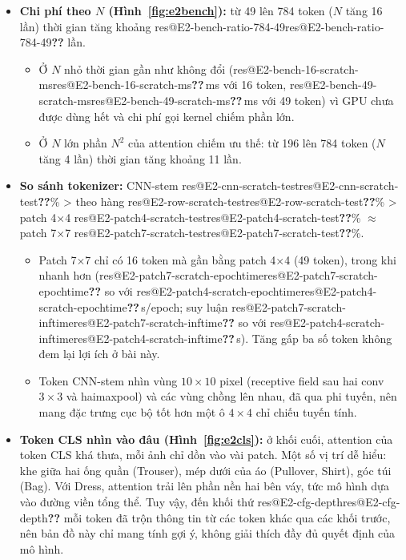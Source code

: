 \documentclass[twoside,final]{hcmut-report}
\makeatletter
\newcommand{\res}[1]{\ifcsname res@#1\endcsname\csname res@#1\endcsname\else\textbf{??}\fi}
\makeatother
\begin{document}
\begin{itemize}
\begin{itemize}
          \item Riêng ma trận $A$ đã chiếm \res{E2-bench-784-attnmb}\,MB và bản tự viết phải lưu nó cho backward. Kernel \texttt{scaled\_dot\_product\_attention} của PyTorch không tạo ra toàn bộ ma trận
                $N\times N$ mà tính lại khi backward.
        \end{itemize}
  \item \textbf{Chi phí theo $N$ (Hình~\ref{fig:e2bench}):} từ 49 lên 784 token ($N$ tăng 16 lần) thời gian tăng khoảng \res{E2-bench-ratio-784-49} lần.
        \begin{itemize}
          \item Ở $N$ nhỏ thời gian gần như không đổi (\res{E2-bench-16-scratch-ms}\,ms với 16 token, \res{E2-bench-49-scratch-ms}\,ms với 49 token) vì GPU chưa được dùng hết và chi phí gọi kernel chiếm phần lớn.
          \item Ở $N$ lớn phần $N^2$ của attention chiếm ưu thế: từ 196 lên 784 token ($N$  tăng 4 lần) thời gian tăng khoảng 11 lần.
        \end{itemize}
  \item \textbf{So sánh tokenizer:} CNN-stem \res{E2-cnn-scratch-test}\% > theo hàng \res{E2-row-scratch-test}\% > patch 4$\times$4 \res{E2-patch4-scratch-test}\% $\approx$ patch 7$\times$7 \res{E2-patch7-scratch-test}\%.
        \begin{itemize}
          \item Patch 7$\times$7 chỉ có 16 token mà gần bằng patch 4$\times$4 (49 token), trong khi nhanh hơn (\res{E2-patch7-scratch-epochtime} so với \res{E2-patch4-scratch-epochtime}\,s/epoch; suy luận \res{E2-patch7-scratch-inftime} so với \res{E2-patch4-scratch-inftime}\,s). Tăng gấp ba số token không đem lại lợi ích ở bài này.
          \item Token CNN-stem nhìn vùng $10\times10$ pixel (receptive field sau hai conv $3\times3$ và haimaxpool) và các vùng chồng lên nhau, đã qua phi tuyến, nên mang đặc trưng cục bộ tốt hơn một ô $4\times4$ chỉ chiếu tuyến tính.
        \end{itemize}
  \item \textbf{Token CLS nhìn vào đâu (Hình~\ref{fig:e2cls}):} ở khối cuối, attention của token CLS khá thưa, mỗi ảnh chỉ dồn vào vài patch. Một số vị trí dễ hiểu: khe giữa hai ống quần (Trouser), mép dưới của áo (Pullover, Shirt), góc túi (Bag). Với Dress, attention trải lên phần nền hai bên váy, tức mô hình dựa vào đường viền tổng thể. Tuy vậy, đến khối thứ \res{E2-cfg-depth} mỗi token đã trộn thông tin từ các token khác qua các khối trước, nên bản đồ này chỉ mang tính gợi ý, không giải thích đầy đủ quyết định của mô hình.

\end{itemize}
\end{document}
